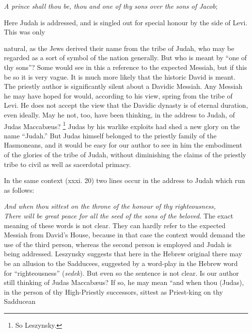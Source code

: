 \emph{A prince shall thou be, thou and one of thy sons over the sons of Jacob};

Here Judah is addressed, and is singled out for special honour by the side of Levi. This was only

natural, as the Jews derived their name from the tribe of Judah, who may be regarded as a sort of symbol of the nation generally. But who is meant by ``one of thy sons''? Some would see in this a reference to the expected Messiah, but if this be so it is very vague. It is much more likely that the historic David is meant. The priestly author is significantly silent about a Davidic Messiah. Any Messiah he may have hoped for would, according to his view, spring from the tribe of Levi. He does not accept the view that the Davidic dynasty is of eternal duration, even ideally. May he not, too, have been thinking, in the address to Judah, of Judas Maccabæus? \footnote{So Leszynsky.} Judas by his warlike exploits had shed a new glory on the name ``Judah.'' But Judas himself belonged to the priestly family of the Hasmoneans, and it would be easy for our author to see in him the embodiment of the glories of the tribe of Judah, without diminishing the claims of the priestly tribe to civil as well as sacerdotal primacy.

In the same context (xxxi. 20) two lines occur in the address to Judah which run as follows:

\emph{And when thou sittest on the throne of the honour of thy righteousness,\\
There will be great peace for all the seed of the sons of the beloved}. The exact meaning of these words is not clear. They can hardly refer to the expected Messiah from David's House, because in that case the context would demand the use of the third person, whereas the second person is employed and Judah is being addressed. Leszynsky suggests that here in the Hebrew original there may be an allusion to the Sadducees, suggested by a word-play in the Hebrew word for ``righteousness'' (\emph{sedek}). But even so the sentence is not clear. Is our author still thinking of Judas Maccabæus? If so, he may mean ``and when thou (Judas), in the person of thy High-Priestly successors, sittest as Priest-king on thy Sadducean

